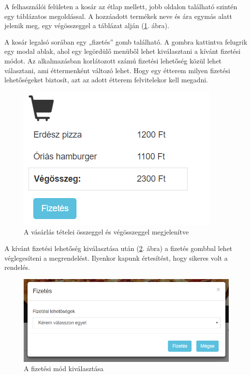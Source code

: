 
A felhasználói felületen a kosár az étlap mellett, jobb oldalon található szintén egy táblázatos megoldással. A hozzáadott termékek neve és ára egymás alatt jelenik meg, egy végösszeggel a táblázat alján (\ref{fig:order}. ábra).

A kosár legalsó sorában egy „fizetés” gomb található. A gombra kattintva felugrik egy modal ablak, ahol egy legördülő menüből lehet kiválasztani a kívánt fizetési módot. Az alkalmazásban korlátozott számú fizetési lehetőség közül lehet választani, ami éttermenként változó lehet. Hogy egy étterem milyen fizetési lehetőségeket biztosít, azt az adott étterem felvitelekor kell megadni.

\begin{figure}
\centering
\includegraphics[scale=1]{kepek/order.png}
\caption{A vásárlás tételei összeggel és végösszeggel megjelenítve}
\label{fig:order}
\end{figure}

A kívánt fizetési lehetőség kiválasztása után (\ref{fig:payment}. ábra) a fizetés gombbal lehet véglegesíteni a megrendelést. Ilyenkor kapunk értesítést, hogy sikeres volt a rendelés.

\begin{figure}
\centering
\includegraphics[scale=0.8]{kepek/payment.png}
\caption{A fizetési mód kiválasztása}
\label{fig:payment}
\end{figure}

